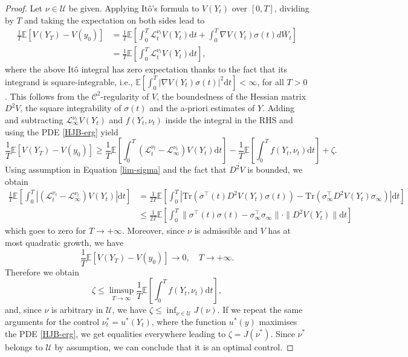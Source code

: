 \documentclass[10pt,a4paper]{amsart}
\newcommand{\D}{\mathrm{d}}
\begin{document}
\begin{proof} Let $\nu \in \mathcal U$ be given. Applying It\^o's formula to $V(Y_t)$ over $[0,T]$, dividing by $T$ and taking the expectation on both sides lead to
\begin{align*}
\frac{1}{T} \mathbb E [ V(Y_T) - V(y_0)] &= \frac{1}{T} \mathbb E\left[\int_0 ^T \mathcal L_t ^{\nu_t} V(Y_t) \D t +\int_0 ^T \nabla V(Y_t) \sigma(t) d \overline W_t \right] \\
& = \frac{1}{T} \mathbb E\left[\int_0 ^T \mathcal L_t ^{\nu_t} V(Y_t) \D t \right],
\end{align*}
where the above It\^o integral has zero expectation thanks to the fact that its integrand is square-integrable, i.e., $\mathbb E[\int_0 ^T |\nabla V(Y_t) \sigma(t)|^2 \D t]< \infty$, for all $T>0$. This follows from the $\mathcal C^2$-regularity of $V$, the boundedness of the Hessian matrix $D^2 V$, the square integrability of $\sigma(t)$ and the a-priori estimates of $Y$.
Adding and subtracting $\mathcal L_\infty ^{\nu_t} V(Y_t)$ and $f(Y_t, \nu_t)$ inside the integral in the RHS and using the PDE \eqref{HJB-erg} yield
\[ \frac{1}{T} \mathbb E [ V(Y_T) - V(y_0)] \geq \frac{1}{T} \mathbb E\left[\int_0 ^T (\mathcal L_t ^{\nu_t} - \mathcal L_\infty ^{\nu_t})V(Y_t) \D t \right] - \frac{1}{T} \mathbb E\left[\int_0 ^T f(Y_t, \nu_t) \D t\right] + \zeta.\]
Using assumption in Equation \eqref{lim-sigma} and the fact that $D^2 V$ is bounded, we obtain
\begin{align*}
\frac{1}{T} \mathbb E\left[\int_0 ^T |(\mathcal L_t ^{\nu_t} - \mathcal L_\infty ^{\nu_t})V(Y_t)| \D t \right] & = \frac{1}{2T} \mathbb E\left[\int_0 ^T |\textrm{Tr} \left( \sigma^\top(t) D^2 V(Y_t) \sigma(t) \right) - \textrm{Tr} \left( \sigma^\top _\infty D^2 V(Y_t) \sigma_\infty \right)| \D t \right] \\
& \le  \frac{1}{2T} \mathbb E\left[\int_0 ^T \| \sigma^\top (t)\sigma (t) - \sigma^\top _\infty \sigma_\infty \| \cdot \| D^2 V(Y_t)\| \D t \right] 
\end{align*}
which goes to zero for $T \to +\infty$.
Moreover, since $\nu$ is admissible and $V$ has at most quadratic growth, we have 
\[ \frac{1}{T} \mathbb E [ V(Y_T) - V(y_0)] \to 0, \quad T \to +\infty.\]
Therefore we obtain
\[ \zeta \leq \limsup_{T \to \infty} \frac{1}{T} \mathbb E\left[\int_0 ^T f(Y_t, \nu_t) \D t\right],\]
and, since $\nu$ is arbitrary in $\mathcal U$, we have $\zeta \leq \inf_{\nu \in \mathcal U} J(\nu)$. If we repeat the same arguments for the control $\nu^*_t = u^*(Y_t)$, where the function $u^*(y)$ maximises the PDE \eqref{HJB-erg}, we get equalities everywhere leading to $\zeta = J(\nu^*)$. Since $\nu ^*$ belongs to $\mathcal U$ by assumption, we can conclude that it is an optimal control.
\end{proof}
\end{document}
